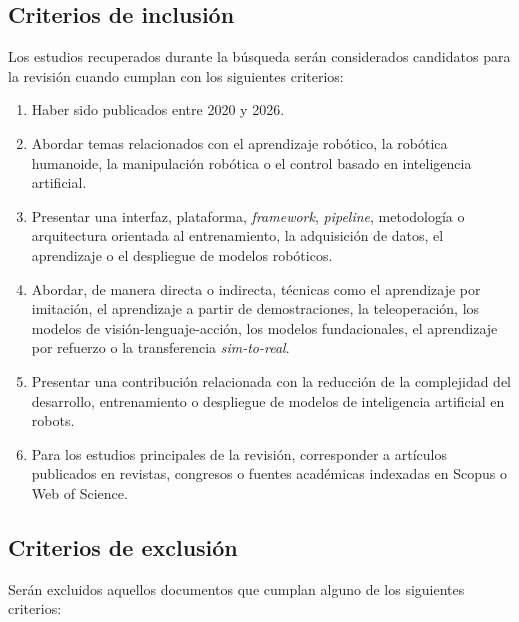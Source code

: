 \documentclass[stu,12pt,floatsintext]{apa7}
\begin{document}
\subsection{Criterios de inclusión}

Los estudios recuperados durante la búsqueda serán considerados candidatos para la revisión cuando cumplan con los siguientes criterios:

\begin{enumerate}
\item Haber sido publicados entre 2020 y 2026.
\item Abordar temas relacionados con el aprendizaje robótico, la robótica humanoide, la manipulación robótica o el control basado en inteligencia artificial.
\item Presentar una interfaz, plataforma, \textit{framework}, \textit{pipeline}, metodología o arquitectura orientada al entrenamiento, la adquisición de datos, el aprendizaje o el despliegue de modelos robóticos.
\item Abordar, de manera directa o indirecta, técnicas como el aprendizaje por imitación, el aprendizaje a partir de demostraciones, la teleoperación, los modelos de visión-lenguaje-acción, los modelos fundacionales, el aprendizaje por refuerzo o la transferencia \textit{sim-to-real}.
\item Presentar una contribución relacionada con la reducción de la complejidad del desarrollo, entrenamiento o despliegue de modelos de inteligencia artificial en robots.
\item Para los estudios principales de la revisión, corresponder a artículos publicados en revistas, congresos o fuentes académicas indexadas en Scopus o Web of Science.
\end{enumerate}

\subsection{Criterios de exclusión}

Serán excluidos aquellos documentos que cumplan alguno de los siguientes criterios:
\end{document}

